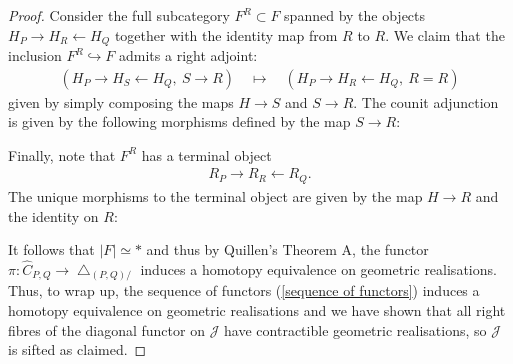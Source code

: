\documentclass[12pt, reqno]{amsart}
\theoremstyle{plain}
\theoremstyle{definition}
\begin{document}
\begin{proof}
Consider the full subcategory $F^R\subset F$ spanned by the objects $H_P\rightarrow H_R\leftarrow H_Q$ together with the identity map from $R$ to $R$. We claim that the inclusion $F^R\hookrightarrow F$ admits a right adjoint:
\begin{align*}
(H_P\rightarrow H_S\leftarrow H_Q,\ S\rightarrow R)\quad \mapsto\quad (H_P\rightarrow H_R\leftarrow H_Q,\ R=R)
\end{align*}
given by simply composing the maps $H\rightarrow S$ and $S\rightarrow R$. The counit adjunction is given by the following morphisms defined by the map $S\rightarrow R$:
\begin{center}
\end{center}

Finally, note that $F^R$ has a terminal object
\begin{align*}
R_P\rightarrow R_R\leftarrow R_Q.
\end{align*}
The unique morphisms to the terminal object are given by the map $H\rightarrow R$ and the identity on $R$:
\begin{center}
\end{center}
It follows that $|F|\simeq \ast$ and thus by Quillen's Theorem A, the functor $\pi\colon \hat{C}_{P,Q}\rightarrow \bigtriangleup_{(P,Q)/}$ induces a homotopy equivalence on geometric realisations. Thus, to wrap up, the sequence of functors (\ref{sequence of functors}) induces a homotopy equivalence on geometric realisations and we have shown that all right fibres of the diagonal functor on $\mathcal{J}$ have contractible geometric realisations, so $\mathcal{J}$ is sifted as claimed.
\end{proof}
\end{document}
